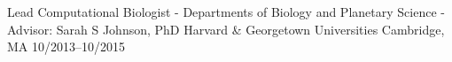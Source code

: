 \begin{cventries}
\vspace{-0.4cm}
      
\cventry
{Lead Computational Biologist - Departments of Biology and Planetary Science - Advisor: Sarah S Johnson, PhD}
{Harvard \& Georgetown Universities}
{Cambridge, MA}
{10/2013--10/2015}
{
}

\vspace{-0.4cm}


\end{cventries}
